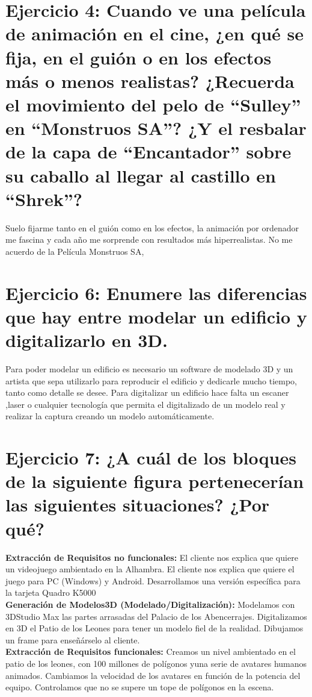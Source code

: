 \documentclass[10pt,a4paper,titlepage]{article}
\begin{document}
\section*{Ejercicio 4: Cuando ve una película de animación en el cine, ¿en qué se fija, en el guión o en los efectos más o menos realistas? ¿Recuerda el movimiento del pelo de ``Sulley'' en ``Monstruos SA''?
¿Y el resbalar de la capa de ``Encantador'' sobre su caballo al llegar al castillo en ``Shrek''?}
Suelo fijarme tanto en el guión como en los efectos, la animación por ordenador me fascina y cada año me sorprende con resultados más hiperrealistas. No me acuerdo de la Película Monstruos SA, 

\section*{Ejercicio 6: Enumere las diferencias que hay entre modelar un edificio y digitalizarlo en 3D.}
Para poder modelar un edificio es necesario un software de modelado 3D y un artista que sepa utilizarlo para reproducir el edificio y dedicarle mucho tiempo, tanto como detalle se desee. Para digitalizar un edificio hace falta un escaner ,laser o cualquier tecnología que permita el digitalizado de un modelo real y realizar la captura creando un modelo automáticamente.

\section*{Ejercicio 7: ¿A cuál de los bloques de la siguiente figura pertenecerían las siguientes situaciones? ¿Por qué?}
\textbf{Extracción de Requisitos no funcionales:} El cliente nos explica que quiere un videojuego ambientado en la Alhambra. El cliente nos explica que quiere el juego para PC (Windows) y Android. Desarrollamos una versión específica para la tarjeta Quadro K5000\\

\textbf{Generación de Modelos3D (Modelado/Digitalización):} Modelamos con 3DStudio Max las partes arrasadas del Palacio de los Abencerrajes. Digitalizamos en 3D el Patio de los Leones para tener un modelo fiel de la realidad. Dibujamos un frame para enseñárselo al cliente.\\

\textbf{Extracción de Requisitos funcionales:}  Creamos un nivel ambientado en el patio de los leones, con 100 millones de polígonos yuna serie de avatares humanos animados. Cambiamos la velocidad de los avatares en función de la potencia del equipo. Controlamos que no se supere un tope de polígonos en la escena.\\
\end{document}
